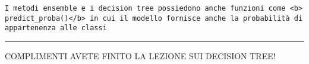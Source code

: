 \documentclass[11pt]{article}
\begin{document}
    \begin{verbatim}
I metodi ensemble e i decision tree possiedono anche funzioni come <b> predict_proba()</b> in cui il modello fornisce anche la probabilità di appartenenza alle classi
\end{verbatim}

\begin{center}\rule{0.5\linewidth}{0.5pt}\end{center}

COMPLIMENTI AVETE FINITO LA LEZIONE SUI DECISION TREE!


    
    
    
\end{document}
